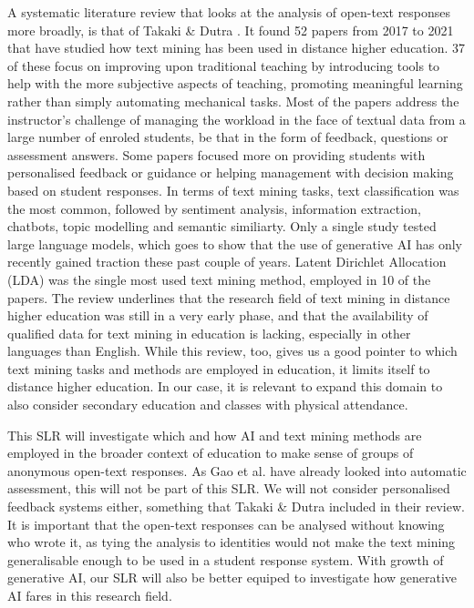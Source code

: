 A systematic literature review that looks at the analysis of open-text responses more broadly, is that of Takaki \& Dutra \cite{textmininglitrev}. It found 52 papers from 2017 to 2021 that have studied how text mining has been used in distance higher education. 37 of these focus on improving upon traditional teaching by introducing tools to help with the more subjective aspects of teaching, promoting meaningful learning rather than simply automating mechanical tasks. Most of the papers address the instructor's challenge of managing the workload in the face of textual data from a large number of enroled students, be that in the form of feedback, questions or assessment answers. Some papers focused more on providing students with personalised feedback or guidance or helping management with decision making based on student responses. In terms of text mining tasks, text classification was the most common, followed by sentiment analysis, information extraction, chatbots, topic modelling and semantic similiarty. Only a single study tested large language models, which goes to show that the use of generative AI has only recently gained traction these past couple of years. Latent Dirichlet Allocation (LDA) was the single most used text mining method, employed in 10 of the papers. The review underlines that the research field of text mining in distance higher education was still in a very early phase, and that the availability of qualified data for text mining in education is lacking, especially in other languages than English. While this review, too, gives us a good pointer to which text mining tasks and methods are employed in education, it limits itself to distance higher education. In our case, it is relevant to expand this domain to also consider secondary education and classes with physical attendance.

This SLR will investigate which and how AI and text mining methods are employed in the broader context of education to make sense of groups of anonymous open-text responses. As Gao et al. \cite{autoassessmentlitrev} have already looked into automatic assessment, this will not be part of this SLR. We will not consider personalised feedback systems either, something that Takaki \& Dutra \cite{textmininglitrev} included in their review. It is important that the open-text responses can be analysed without knowing who wrote it, as tying the analysis to identities would not make the text mining generalisable enough to be used in a student response system. With growth of generative AI, our SLR will also be better equiped to investigate how generative AI fares in this research field.

